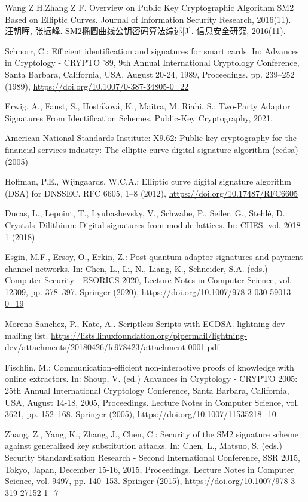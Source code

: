 \documentclass[review]{jcr}
\begin{document}
\begin{thebibliography}{10}
 Wang Z H,Zhang Z F. Overview on Public Key Cryptographic Algorithm SM2 Based on Elliptic Curves. Journal of Information Security Research, 2016(11).\\
汪朝晖, 张振峰. SM2椭圆曲线公钥密码算法综述[J]. 信息安全研究, 2016(11).

Schnorr, C.: Efficient identification and signatures for smart cards. In:
  Advances in Cryptology - {CRYPTO} '89, 9th Annual International Cryptology
  Conference, Santa Barbara, California, USA, August 20-24, 1989, Proceedings.
  pp. 239--252 (1989), \url{https://doi.org/10.1007/0-387-34805-0\_22}

Erwig, A., Faust, S., Host{\'{a}}kov{\'{a}}, K., Maitra, M. Riahi, S.: Two-Party Adaptor Signatures From Identification Schemes. Public-Key Cryptography, 2021.

{American National Standards Institute}: X9.62: Public key cryptography for the
  financial services industry: The elliptic curve digital signature algorithm
  (ecdsa) (2005)

Hoffman, P.E., Wijngaards, W.C.A.: Elliptic curve digital signature algorithm
  {(DSA)} for {DNSSEC}. {RFC}  6605,  1--8 (2012),
  \url{https://doi.org/10.17487/RFC6605}

Ducas, L., Lepoint, T., Lyubashevsky, V., Schwabe, P., Seiler, G., Stehlé, D.: Crystals–Dilithium: Digital signatures from module lattices. In: CHES. vol. 2018-1
(2018)

Esgin, M.F., Ersoy, O., Erkin, Z.: Post-quantum adaptor signatures and payment
  channel networks. In: Chen, L., Li, N., Liang, K., Schneider, S.A. (eds.)
  Computer Security - {ESORICS} 2020, Lecture Notes in Computer Science, vol. 12309, pp.
  378--397. Springer (2020),
  \url{https://doi.org/10.1007/978-3-030-59013-0\_19}

Moreno{-}Sanchez, P., Kate, A.. Scriptless Scripts with ECDSA. lightning-dev mailing list. \url{https://lists.linuxfoundation.org/pipermail/lightning-dev/attachments/20180426/fe978423/attachment-0001.pdf}

Fischlin, M.: Communication-efficient non-interactive proofs of knowledge with
  online extractors. In: Shoup, V. (ed.) Advances in Cryptology - {CRYPTO}
  2005: 25th Annual International Cryptology Conference, Santa Barbara,
  California, USA, August 14-18, 2005, Proceedings. Lecture Notes in Computer
  Science, vol. 3621, pp. 152--168. Springer (2005),
  \url{https://doi.org/10.1007/11535218\_10}

Zhang, Z., Yang, K., Zhang, J., Chen, C.: Security of the {SM2} signature
  scheme against generalized key substitution attacks. In: Chen, L., Matsuo, S.
  (eds.) Security Standardisation Research - Second International Conference,
  {SSR} 2015, Tokyo, Japan, December 15-16, 2015, Proceedings. Lecture Notes in
  Computer Science, vol. 9497, pp. 140--153. Springer (2015),
  \url{https://doi.org/10.1007/978-3-319-27152-1\_7}



\end{thebibliography}
\end{document}
